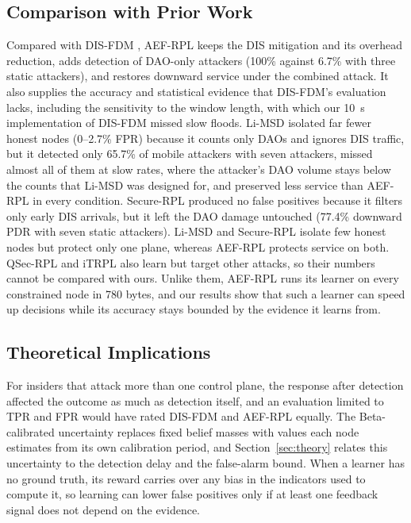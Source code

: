 \subsection{Comparison with Prior Work}
Compared with DIS-FDM \cite{prajisha2025}, AEF-RPL keeps the DIS mitigation and its overhead reduction, adds detection of DAO-only attackers (100\% against 6.7\% with three static attackers), and restores downward service under the combined attack. It also supplies the accuracy and statistical evidence that DIS-FDM's evaluation lacks, including the sensitivity to the window length, with which our 10~s implementation of DIS-FDM missed slow floods. Li-MSD \cite{limsd2024} isolated far fewer honest nodes (0--2.7\% FPR) because it counts only DAOs and ignores DIS traffic, but it detected only 65.7\% of mobile attackers with seven attackers, missed almost all of them at slow rates, where the attacker's DAO volume stays below the counts that Li-MSD was designed for, and preserved less service than AEF-RPL in every condition. Secure-RPL \cite{vermaranga2020} produced no false positives because it filters only early DIS arrivals, but it left the DAO damage untouched (77.4\% downward PDR with seven static attackers). Li-MSD and Secure-RPL isolate few honest nodes but protect only one plane, whereas AEF-RPL protects service on both. QSec-RPL \cite{qsecrpl2023} and iTRPL \cite{itrpl2024} also learn but target other attacks, so their numbers cannot be compared with ours. Unlike them, AEF-RPL runs its learner on every constrained node in 780 bytes, and our results show that such a learner can speed up decisions while its accuracy stays bounded by the evidence it learns from.

\subsection{Theoretical Implications}
For insiders that attack more than one control plane, the response after detection affected the outcome as much as detection itself, and an evaluation limited to TPR and FPR would have rated DIS-FDM and AEF-RPL equally. The Beta-calibrated uncertainty replaces fixed belief masses with values each node estimates from its own calibration period, and Section~\ref{sec:theory} relates this uncertainty to the detection delay and the false-alarm bound. When a learner has no ground truth, its reward carries over any bias in the indicators used to compute it, so learning can lower false positives only if at least one feedback signal does not depend on the evidence.

